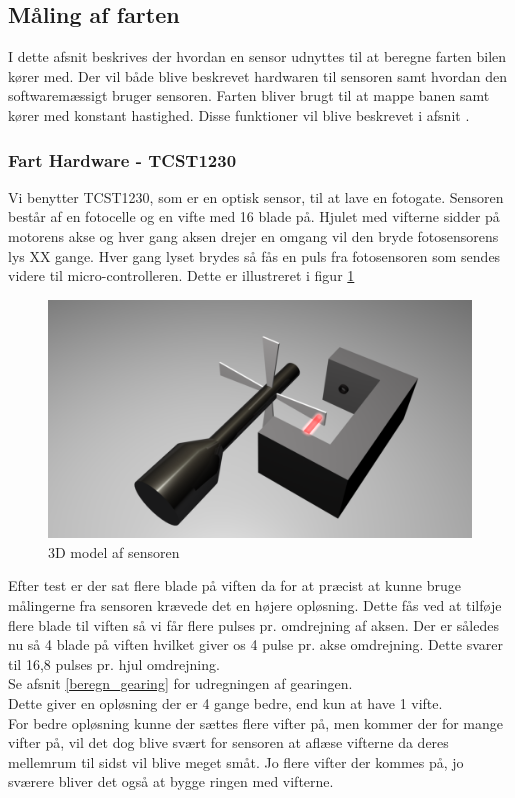 


\subsection{Måling af farten}
\label{fartmål}
I dette afsnit beskrives der hvordan en sensor udnyttes til at beregne farten bilen kører med. Der vil både blive beskrevet hardwaren til sensoren samt hvordan den softwaremæssigt bruger sensoren. Farten bliver brugt til at mappe banen samt kører med konstant hastighed. Disse funktioner vil blive beskrevet i afsnit . \\

\subsubsection{Fart Hardware - TCST1230}
\label{fartmål_hardware}
Vi benytter TCST1230, som er en optisk sensor, til at lave en fotogate. Sensoren består af en fotocelle og en vifte med 16 blade på. Hjulet med vifterne sidder på motorens akse og hver gang aksen drejer en omgang vil den bryde fotosensorens lys XX gange. Hver gang lyset brydes så fås en puls fra fotosensoren som sendes videre til micro-controlleren. Dette er illustreret i figur \ref{wheelspeed3D} 

\begin{figure}[h!]
\center
\includegraphics[scale=0.2]{./Graphics/Wheelspeed_D}
\caption{3D model af sensoren}
\label{wheelspeed3D}
\end{figure}

Efter test er der sat flere blade på viften da for at præcist at kunne bruge målingerne fra sensoren krævede det en højere opløsning. Dette fås ved at tilføje flere blade til viften så vi får flere pulses pr. omdrejning af aksen. Der er således nu så 4 blade på viften hvilket giver os 4 pulse pr. akse omdrejning. Dette svarer til 16,8 pulses pr. hjul omdrejning. \\
Se afsnit \ref{beregn_gearing} for udregningen af gearingen. \\
Dette giver en opløsning der er 4 gange bedre, end kun at have 1 vifte. \\
For bedre opløsning kunne der sættes flere vifter på, men kommer der for mange vifter på, vil det dog blive svært for sensoren at aflæse vifterne da deres mellemrum til sidst vil blive meget småt. Jo flere vifter der kommes på, jo sværere bliver det også at bygge ringen med vifterne. \\

